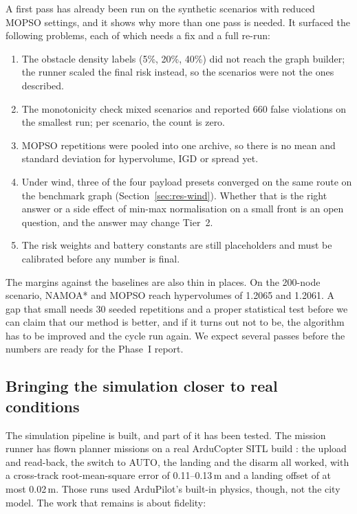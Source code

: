 \documentclass{ssnreview}
\begin{document}
A first pass has already been run on the synthetic scenarios with reduced MOPSO settings,
and it shows why more than one pass is needed. It surfaced the following problems, each of
which needs a fix and a full re-run:

\begin{enumerate}[label=(\alph*)]
  \item The obstacle density labels (5\%, 20\%, 40\%) did not reach the graph builder;
  the runner scaled the final risk instead, so the scenarios were not the ones
  described.
  \item The monotonicity check mixed scenarios and reported 660 false violations on the
  smallest run; per scenario, the count is zero.
  \item MOPSO repetitions were pooled into one archive, so there is no mean and standard
  deviation for hypervolume, IGD or spread yet.
  \item Under wind, three of the four payload presets converged on the same route on the
  benchmark graph (Section~\ref{sec:res-wind}). Whether that is the right answer or a
  side effect of min-max normalisation on a small front is an open question, and the
  answer may change Tier~2.
  \item The risk weights and battery constants are still placeholders and must be
  calibrated before any number is final.
\end{enumerate}

The margins against the baselines are also thin in places. On the 200-node scenario,
NAMOA* and MOPSO reach hypervolumes of 1.2065 and 1.2061. A gap that small needs
30 seeded repetitions and a proper statistical test before we can claim that our method
is better, and if it turns out not to be, the algorithm has to be improved and the cycle
run again. We expect several passes before the numbers are ready for the Phase~I report.

\subsection{Bringing the simulation closer to real conditions}

The simulation pipeline is built, and part of it has been tested. The mission runner has
flown planner missions on a real ArduCopter SITL build \cite{r23}: the upload and
read-back, the switch to AUTO, the landing and the disarm all worked, with a cross-track
root-mean-square error of 0.11--0.13\,m and a landing offset of at most 0.02\,m. Those
runs used ArduPilot's built-in physics, though, not the city model. The work that remains
is about fidelity:
\end{document}
